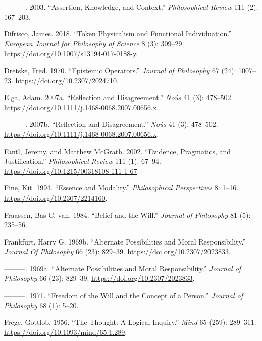 \documentclass[
  12pt,
  letterpaper,
  DIV=11,
  numbers=noendperiod]{scrartcl}
\newlength{\cslhangindent}
\newenvironment{CSLReferences}[2] %
 {\begin{list}{}{%
  \setlength{\itemindent}{0pt}
  \setlength{\leftmargin}{0pt}
  \setlength{\parsep}{0pt}
  \ifodd #1
   \setlength{\leftmargin}{\cslhangindent}
   \setlength{\itemindent}{-1\cslhangindent}
  \fi
  \setlength{\itemsep}{#2\baselineskip}}}
 {\end{list}}
\begin{document}
\begin{CSLReferences}{1}{0}
---------. 2003. {``Assertion, Knowledge, and Context.''}
\emph{Philosophical Review} 111 (2): 167--203.

Difrisco, James. 2018. {``Token Physicalism and Functional
Individuation.''} \emph{European Journal for Philosophy of Science} 8
(3): 309--29. \url{https://doi.org/10.1007/s13194-017-0188-y}.

Dretske, Fred. 1970. {``Epistemic Operators.''} \emph{Journal of
Philosophy} 67 (24): 1007--23. \url{https://doi.org/10.2307/2024710}.

Elga, Adam. 2007a. {``Reflection and Disagreement.''} \emph{No{û}s} 41
(3): 478--502. \url{https://doi.org/10.1111/j.1468-0068.2007.00656.x}.

---------. 2007b. {``Reflection and Disagreement.''} \emph{Noûs} 41 (3):
478--502. \url{https://doi.org/10.1111/j.1468-0068.2007.00656.x}.

Fantl, Jeremy, and Matthew McGrath. 2002. {``Evidence, Pragmatics, and
Justification.''} \emph{Philosophical Review} 111 (1): 67--94.
\url{https://doi.org/10.1215/00318108-111-1-67}.

Fine, Kit. 1994. {``Essence and Modality.''} \emph{Philosophical
Perspectives} 8: 1--16. \url{https://doi.org/10.2307/2214160}.

Fraassen, Bas C. van. 1984. {``Belief and the Will.''} \emph{Journal of
Philosophy} 81 (5): 235--56.

Frankfurt, Harry G. 1969b. {``Alternate Possibilities and Moral
Responsibility.''} \emph{Journal Of Philosophy} 66 (23): 829--39.
\url{https://doi.org/10.2307/2023833}.

---------. 1969a. {``Alternate Possibilities and Moral
Responsibility.''} \emph{Journal of Philosophy} 66 (23): 829--39.
\url{https://doi.org/10.2307/2023833}.

---------. 1971. {``Freedom of the Will and the Concept of a Person.''}
\emph{Journal of Philosophy} 68 (1): 5--20.

Frege, Gottlob. 1956. {``The Thought: A Logical Inquiry.''} \emph{Mind}
65 (259): 289--311. \url{https://doi.org/10.1093/mind/65.1.289}.


\end{CSLReferences}
\end{document}
